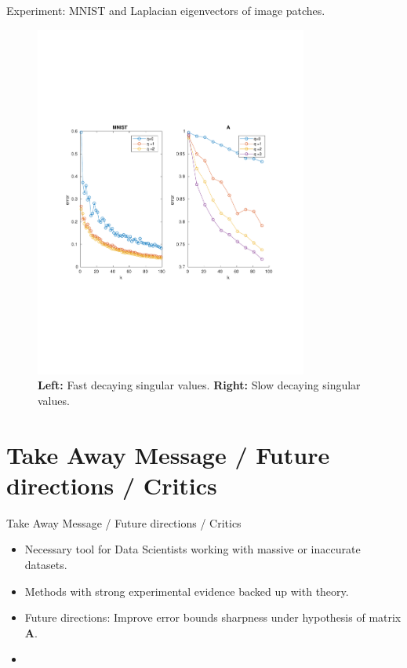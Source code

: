 \documentclass{beamer}
\newcommand{\mtx}[1]{\bm{#1}}
\begin{document}
\begin{frame}{Experiment: MNIST and Laplacian eigenvectors of image patches.}
\begin{figure}[H] \label{fig:exp2}
\begin{center}
\includegraphics[width=0.8\textwidth, trim=0cm 8cm 0cm 7cm, clip=true]{../report/figures/2-1.pdf}
\end{center}
\caption{\textbf{Left:} Fast decaying singular values. \textbf{Right:} Slow decaying singular
values.}
\end{figure}
\end{frame}


\section{Take Away Message / Future directions / Critics}
\begin{frame}{Take Away Message / Future directions / Critics}
\begin{itemize}
  \item Necessary tool for Data Scientists working with massive or inaccurate 
  datasets.
  \item Methods with strong experimental evidence backed up with theory.
  \item Future directions: Improve error bounds sharpness under hypothesis
  of matrix $\mtx{A}$.
  \item 
\end{itemize}
\end{frame}
\end{document}
